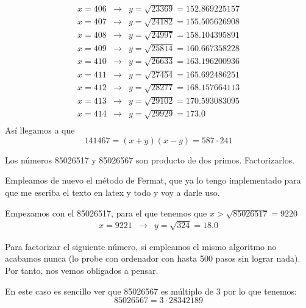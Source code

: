 \begin{problem}[4]
\[\begin{array}{lcl}
x= 406  & \to &  y=\sqrt{ 23369 }= 152.869225157 \\
x= 407  & \to &  y=\sqrt{ 24182 }= 155.505626908 \\
x= 408  & \to &  y=\sqrt{ 24997 }= 158.104395891 \\
x= 409  & \to &  y=\sqrt{ 25814 }= 160.667358228 \\
x= 410  & \to &  y=\sqrt{ 26633 }= 163.196200936 \\
x= 411  & \to &  y=\sqrt{ 27454 }= 165.692486251 \\
x= 412  & \to &  y=\sqrt{ 28277 }= 168.157664113 \\
x= 413  & \to &  y=\sqrt{ 29102 }= 170.593083095 \\
x= 414  & \to &  y=\sqrt{ 29929 }= 173.0 \\
\end{array}\]
Así llegamos a que 
\[141467 = (x+y)(x-y) = 587 \cdot 241\]
\end{problem}


\begin{problem}[5]
Los números 85026517 y 85026567 son producto de dos
primos. Factorizarlos.
\solution


Empleamos de nuevo el método de Fermat, que ya lo tengo implementado para que me escriba el texto en latex y todo y voy a darle uso.

Empezamos con el 85026517, para el que tenemos que $x> \sqrt{85026517}=9220$
\[\begin{array}{lcl}
x= 9221 & \to & y=\sqrt{ 324}= 18.0 
\end{array}\]

Para factorizar el siguiente número, si empleamos el mismo algoritmo no acabamos nunca (lo probe con ordenador con hasta 500 pasos sin lograr nada). Por tanto, nos vemos obligados a pensar.

En este caso es sencillo ver que 85026567 es múltiplo de 3 por lo que tenemos:
\[85026567 = 3 \cdot 28342189\]
\end{problem}

